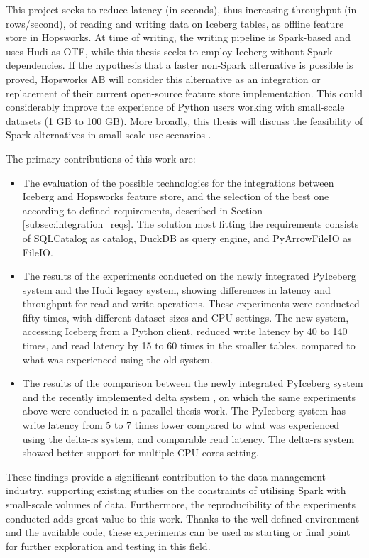 This project seeks to reduce latency (in seconds), thus increasing throughput (in rows/second), of reading and writing data on Iceberg tables, as offline feature store in Hopsworks. At time of writing, the writing pipeline is Spark-based and uses Hudi as \gls{OTF}, while this thesis seeks to employ Iceberg without Spark-dependencies. If the hypothesis that a faster non-Spark alternative is possible is proved, Hopsworks AB will consider this alternative as an integration or replacement of their current open-source feature store implementation. This could considerably improve the experience of Python users working with small-scale datasets (1 GB to 100 GB). More broadly, this thesis will discuss the feasibility of Spark alternatives in small-scale use scenarios \cite{manfrediReducingReadWrite2024}.

The primary contributions of this work are:
\begin{itemize}
    \item The evaluation of the possible technologies for the integrations between Iceberg and Hopsworks feature store, and the selection of the best one according to defined requirements, described in Section \ref{subsec:integration_reqs}. The solution most fitting the requirements consists of SQLCatalog as catalog, DuckDB as query engine, and PyArrowFileIO as FileIO.
    \item The results of the experiments conducted on the newly integrated PyIceberg system and the Hudi legacy system, showing differences in latency and throughput for read and write operations. These experiments were conducted fifty times, with different dataset sizes and \gls{CPU} settings. The new system, accessing Iceberg from a Python client, reduced write latency by 40 to 140 times, and read latency by 15 to 60 times in the smaller tables, compared to what was experienced using the old system.
    \item The results of the comparison between the newly integrated PyIceberg system and the recently implemented delta system \cite{manfrediReducingReadWrite2024}, on which the same experiments above were conducted in a parallel thesis work. The PyIceberg system has write latency from 5 to 7 times lower compared to what was experienced using the delta-rs system, and comparable read latency. The delta-rs system showed better support for multiple \gls{CPU} cores setting.
\end{itemize}

These findings provide a significant contribution to the data management industry, supporting existing studies on the constraints of utilising Spark with small-scale volumes of data. Furthermore, the reproducibility of the experiments conducted adds great value to this work. Thanks to the well-defined environment and the available code, these experiments can be used as starting or final point for further exploration and testing in this field. 